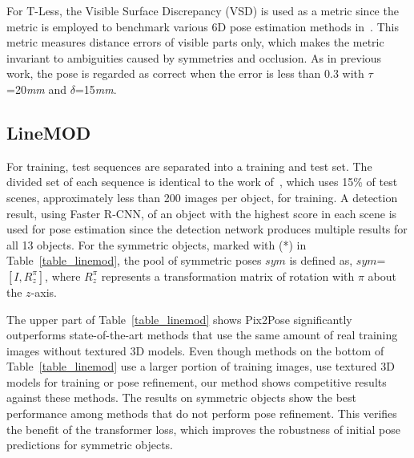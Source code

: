 \documentclass[10pt,twocolumn,letterpaper]{article}
\begin{document}
For T-Less, the Visible Surface Discrepancy (VSD) is used as a metric since the metric is employed to benchmark various 6D pose estimation methods in~\cite{Hodan_2018_ECCV_bop}. This metric measures distance errors of visible parts only, which makes the metric invariant to ambiguities caused by symmetries and occlusion. As in previous work, the pose is regarded as correct when the error is less than 0.3 with $\tau$=20\textit{mm} and $\delta$=15\textit{mm}. 


\subsection{LineMOD} \label{eval_linemod}
For training, test sequences are separated into a training and test set. The divided set of each sequence is identical to the work of~\cite{cnn_pose:brachmann2016uncertainty_only_rgb, Tekin_2018_CVPR}, which uses 15\% of test scenes, approximately less than 200 images per object, for training. A detection result, using Faster R-CNN, of an object with the highest score in each scene is used for pose estimation since the detection network produces multiple results for all 13 objects. For the symmetric objects, marked with (*) in Table~\ref{table_linemod}, the pool of symmetric poses $sym$ is defined as, $sym$= $[I,R^{\pi}_z]$, where $R^{\pi}_{z}$ represents a transformation matrix of rotation with $\pi$ about the $z$-axis.

The upper part of Table~\ref{table_linemod} shows Pix2Pose significantly outperforms state-of-the-art methods that use the same amount of real training images without textured 3D models. Even though methods on the bottom of Table~\ref{table_linemod} use a larger portion of training images, use textured 3D models for training or pose refinement, our method shows competitive results against these methods. The results on symmetric objects show the best performance among methods that do not perform pose refinement. This verifies the benefit of the transformer loss, which improves the robustness of initial pose predictions for symmetric objects. 
\end{document}

